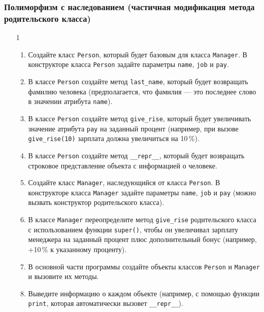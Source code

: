 \subsubsection{Полиморфизм с наследованием (частичная модификация метода родительского класса)}
\begin{enumerate}
\item[1] 
\begin{enumerate}
    \item Создайте класс \texttt{Person}, который будет базовым для класса \texttt{Manager}. В конструкторе класса \texttt{Person} задайте параметры \texttt{name}, \texttt{job} и \texttt{pay}.
    
    \item В классе \texttt{Person} создайте метод \texttt{last\_name}, который будет возвращать фамилию человека (предполагается, что фамилия — это последнее слово в значении атрибута \texttt{name}).
    
    \item В классе \texttt{Person} создайте метод \texttt{give\_rise}, который будет увеличивать значение атрибута \texttt{pay} на заданный процент (например, при вызове \texttt{give\_rise(10)} зарплата должна увеличиться на 10\,\%).
    
    \item В классе \texttt{Person} создайте метод \texttt{\_\_repr\_\_}, который будет возвращать строковое представление объекта с информацией о человеке.
    
    \item Создайте класс \texttt{Manager}, наследующийся от класса \texttt{Person}. В конструкторе класса \texttt{Manager} задайте параметры \texttt{name}, \texttt{job} и \texttt{pay} (можно вызвать конструктор родительского класса).
    
    \item В классе \texttt{Manager} переопределите метод \texttt{give\_rise} родительского класса с использованием функции \texttt{super()}, чтобы он увеличивал зарплату менеджера на заданный процент плюс дополнительный бонус (например, +10\,\% к указанному проценту).
    
    \item В основной части программы создайте объекты классов \texttt{Person} и \texttt{Manager} и вызовите их методы.
    
    \item Выведите информацию о каждом объекте (например, с помощью функции \texttt{print}, которая автоматически вызовет \texttt{\_\_repr\_\_}).
\end{enumerate}


\end{enumerate}
